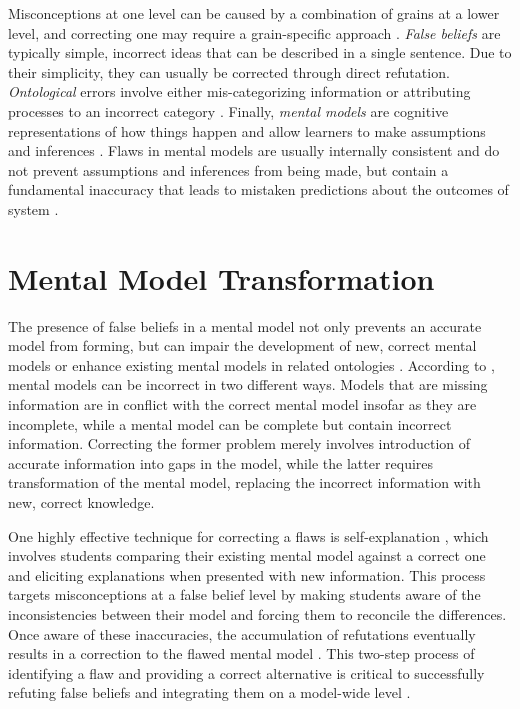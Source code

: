 Misconceptions at one level can be caused by a combination of grains at a lower level, and correcting one may require a grain-specific approach \citep{Gadgil2012}. \emph{False beliefs} are typically simple, incorrect ideas that can be described in a single sentence. Due to their simplicity, they can usually be corrected through direct refutation. \emph{Ontological} errors involve either mis-categorizing information or attributing processes to an incorrect category \citep{Chi1994}. Finally, \emph{mental models} are cognitive representations of how things happen \citep{Klein2006} and allow learners to make assumptions and inferences \citep{Gadgil2012}. Flaws in mental models are usually internally consistent and do not prevent assumptions and inferences from being made, but contain a fundamental inaccuracy that leads to mistaken predictions about the outcomes of system \citep{Vosniadou1994}.

\section{Mental Model Transformation}

The presence of false beliefs in a mental model not only prevents an accurate model from forming, but can impair the development of new, correct mental models or enhance existing mental models in related ontologies \citep{Jacobson2013}. According to \citet{Chi2008}, mental models can be incorrect in two different ways. Models that are missing information are in conflict with the correct mental model insofar as they are incomplete, while a mental model can be complete but contain incorrect information. Correcting the former problem merely involves introduction of accurate information into gaps in the model, while the latter requires transformation of the mental model, replacing the incorrect information with new, correct knowledge.

One highly effective technique for correcting a flaws is self-explanation \citep{Chi1994}, which involves students comparing their existing mental model against a correct one and eliciting explanations when presented with new information. This process targets misconceptions at a false belief level by making students aware of the inconsistencies between their model and forcing them to reconcile the differences. Once aware of these inaccuracies, the accumulation of refutations eventually results in a correction to the flawed mental model \citep{Chi2008}. This two-step process of identifying a flaw and providing a correct alternative is critical to successfully refuting false beliefs and integrating them on a model-wide level \citep{Chi1994, Klein2006}.

